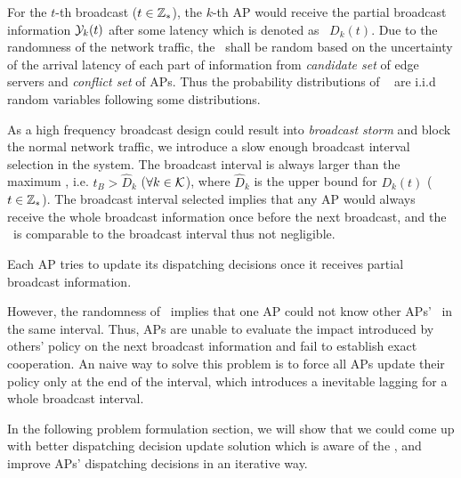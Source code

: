 For the $t$-th broadcast ($t\in\mathbb{Z}_{*}$), the $k$-th AP would receive the partial broadcast information $\mathcal{Y}_{k}(t)$ after some latency which is denoted as \brdelay~$D_{k}(t)$.
Due to the randomness of the network traffic, the \brdelay~shall be random based on the uncertainty of the arrival latency of each part of information from \emph{candidate set} of edge servers and \emph{conflict set} of APs.
Thus the probability distributions of \brdelay~ are i.i.d random variables following some distributions.


As a high frequency broadcast design could result into \emph{broadcast storm} and block the normal network traffic, we introduce a slow enough broadcast interval selection in the system.
The broadcast interval is always larger than the maximum \brdelay, i.e. $t_B > \hat{D}_k$ ($\forall k\in\mathcal{K}$), where $\hat{D}_k$ is the upper bound for $D_{k}({t})$ ($t\in\mathbb{Z}_{*}$).
The broadcast interval selected implies that any AP would always receive the whole broadcast information once before the next broadcast, and the \brdelay~is comparable to the broadcast interval thus not negligible.

Each AP tries to update its dispatching decisions once it receives partial broadcast information.

However, the randomness of \brdelay~implies that one AP could not know other APs' \brdelay~in the same interval.
Thus, APs are unable to evaluate the impact introduced by others' policy on the next broadcast information and fail to establish exact cooperation.
An naive way to solve this problem is to force all APs update their policy only at the end of the interval, which introduces a inevitable lagging for a whole broadcast interval.

In the following problem formulation section, we will show that we could come up with better dispatching decision update solution which is aware of the \brdelay, and improve APs' dispatching decisions in an iterative way.
